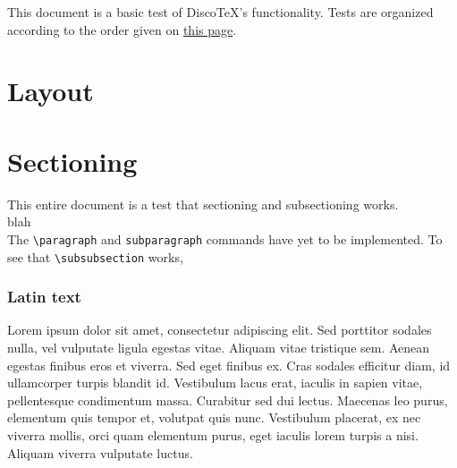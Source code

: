 \documentclass[11pt]{article}
\newcommand{\DiscoTeX}[1]{Disco\TeX}
\newcommand{\ifdisco}[2]{#2}
\begin{document}
\tableofcontents
This document is a basic test of \DiscoTeX{}'s functionality.
Tests are organized according to the order given on \href{ftp://ftp.tex.ac.uk/tex-archive/info/latex2e-help-texinfo/latex2e.html}{this page}.
\section{}%
\section{}%
\section{}%
\section{}%
\section{}%
\section{Layout} %
\section{Sectioning}
This entire \ifdisco{page}{document} is a test that sectioning and subsectioning works.\\
blah\\[2cm]
The \verb|\paragraph| and \verb|subparagraph| commands have yet to be implemented.
To see that \verb|\subsubsection| works,

\subsubsection{Latin text}
Lorem ipsum dolor sit amet, consectetur adipiscing elit. Sed porttitor sodales nulla, vel vulputate ligula egestas vitae. Aliquam vitae tristique sem. Aenean egestas finibus eros et viverra. Sed eget finibus ex. Cras sodales efficitur diam, id ullamcorper turpis blandit id. Vestibulum lacus erat, iaculis in sapien vitae, pellentesque condimentum massa. Curabitur sed dui lectus. Maecenas leo purus, elementum quis tempor et, volutpat quis nunc. Vestibulum placerat, ex nec viverra mollis, orci quam elementum purus, eget iaculis lorem turpis a nisi. Aliquam viverra vulputate luctus.
\end{document}
